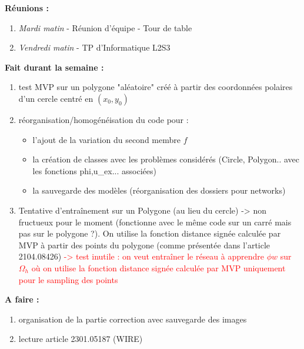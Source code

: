 \textbf{Réunions :}
\begin{enumerate}[label=\textbullet]
	\item \textit{Mardi matin} -  Réunion d'équipe - Tour de table
	\item \textit{Vendredi matin} - TP d'Informatique L2S3
\end{enumerate}
\textbf{Fait durant la semaine :}
\begin{enumerate}[label=\textbullet]
	\item test MVP sur un polygone "aléatoire" créé à partir des coordonnées polaires d'un cercle centré en $(x_0,y_0)$
	\item réorganisation/homogénéisation du code pour :
	\begin{itemize}
		\item l'ajout de la variation du second membre $f$
		\item la création de classes avec les problèmes considérés (Circle, Polygon.. avec les fonctions phi,u\_ex... associées)
		\item la sauvegarde des modèles (réorganisation des dossiers pour networks)
	\end{itemize}
	\item Tentative d'entraînement sur un Polygone (au lieu du cercle) -> non fructueux pour le moment (fonctionne avec le même code sur un carré mais pas sur le polygone ?). On utilise la fonction distance signée calculée par MVP à partir des points du polygone (comme présentée dans l'article 2104.08426) \textcolor{red}{-> test inutile : on veut entraîner le réseau à apprendre $\phi w$ sur $\Omega_h$ où on utilise la fonction distance signée calculée par MVP uniquement pour le sampling des points}
\end{enumerate}

\textbf{A faire :}
\begin{enumerate}[label=\textbullet]
	\item organisation de la partie correction avec sauvegarde des images 
	\item lecture article 2301.05187 (WIRE)
\end{enumerate}